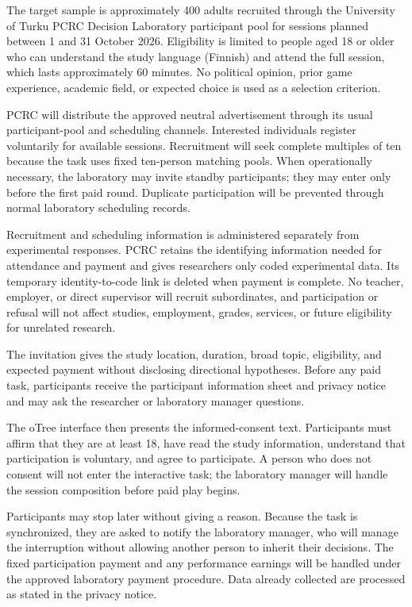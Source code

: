 


The target sample is approximately 400 adults recruited through the University of Turku PCRC Decision Laboratory participant pool for sessions planned between 1 and 31 October 2026. Eligibility is limited to people aged 18 or older who can understand the study language (Finnish) and attend the full session, which lasts approximately 60 minutes. No political opinion, prior game experience, academic field, or expected choice is used as a selection criterion.

PCRC will distribute the approved neutral advertisement through its usual participant-pool and scheduling channels. Interested individuals register voluntarily for available sessions. Recruitment will seek complete multiples of ten because the task uses fixed ten-person matching pools. When operationally necessary, the laboratory may invite standby participants; they may enter only before the first paid round. Duplicate participation will be prevented through normal laboratory scheduling records.

Recruitment and scheduling information is administered separately from experimental responses. PCRC retains the identifying information needed for attendance and payment and gives researchers only coded experimental data. Its temporary identity-to-code link is deleted when payment is complete. No teacher, employer, or direct supervisor will recruit subordinates, and participation or refusal will not affect studies, employment, grades, services, or future eligibility for unrelated research.

The invitation gives the study location, duration, broad topic, eligibility, and expected payment without disclosing directional hypotheses. Before any paid task, participants receive the participant information sheet and privacy notice and may ask the researcher or laboratory manager questions.

The oTree interface then presents the informed-consent text. Participants must affirm that they are at least 18, have read the study information, understand that participation is voluntary, and agree to participate. A person who does not consent will not enter the interactive task; the laboratory manager will handle the session composition before paid play begins.

Participants may stop later without giving a reason. Because the task is synchronized, they are asked to notify the laboratory manager, who will manage the interruption without allowing another person to inherit their decisions. The fixed participation payment and any performance earnings will be handled under the approved laboratory payment procedure. Data already collected are processed as stated in the privacy notice.

